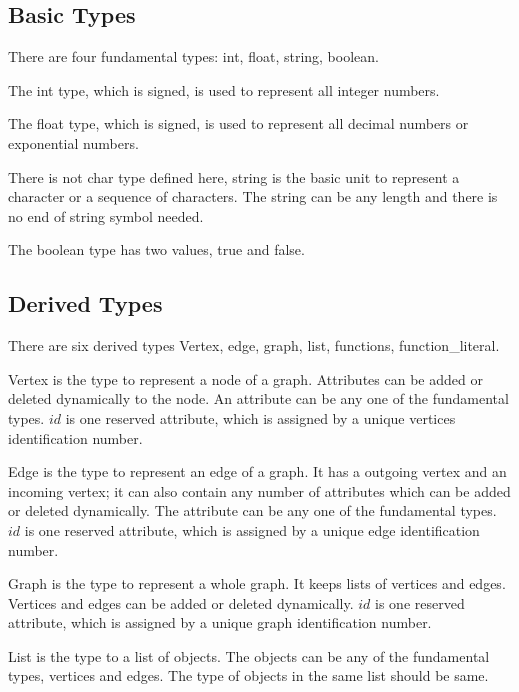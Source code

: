 \documentclass[letterpaper,12pt]{article}
\begin{document}
\subsection{Basic Types}\label{sec:basic_types}
There are four fundamental types: int, float, string, boolean. \newline

The int type, which is signed, is used to represent all integer numbers. \newline

The float type, which is signed, is used to represent all decimal numbers or exponential numbers. \newline

There is not char type defined here, string is the basic unit to represent a character or a sequence of characters. The string can be any length and there is no end of string symbol needed. \newline

The boolean type has two values, true and false.

\subsection{Derived Types}
There are six derived types Vertex, edge, graph, list, functions, function\_literal.\newline

  Vertex is the type to represent a node of a graph. Attributes can be added or deleted dynamically to the node. An attribute can be any one of the fundamental types. $id$ is one reserved attribute, which is assigned by a unique vertices identification number. \newline

  Edge is the type to represent an edge of a graph. It has a outgoing vertex and an incoming vertex; it can also contain any number of attributes which can be added or deleted dynamically. The attribute can be any one of the fundamental types. $id$ is one reserved attribute, which is assigned by a unique edge identification number. \newline

  Graph is the type to represent a whole graph. It keeps lists of vertices and edges. Vertices and edges can be added or deleted dynamically. $id$ is one reserved attribute, which is assigned by a unique graph identification number. \newline

  List is the type to a list of objects. The objects can be any of the fundamental types, vertices and edges. The type of objects in the same list should be same. \newline
\end{document}
